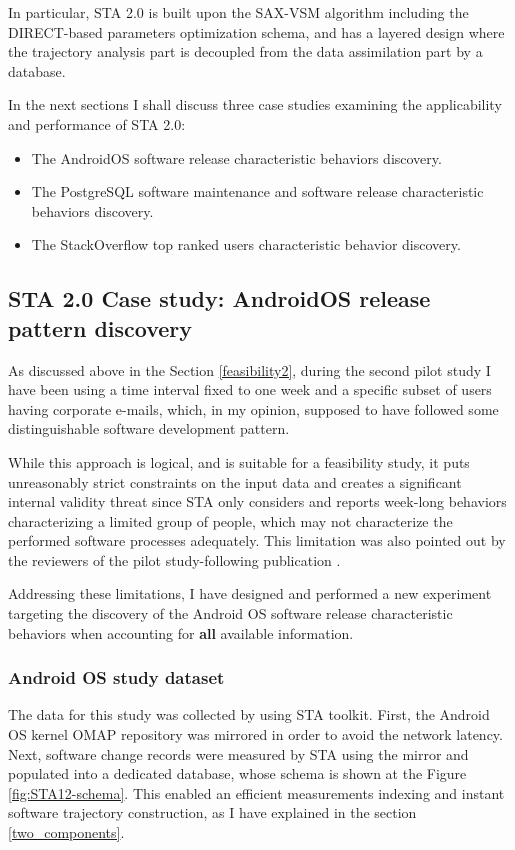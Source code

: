 In particular, STA 2.0 is built upon the SAX-VSM algorithm including the DIRECT-based parameters optimization schema, and has a layered design where the trajectory analysis part is decoupled from the data assimilation part by a database.

In the next sections I shall discuss three case studies examining the applicability and performance of STA 2.0:
\begin{itemize}
 \item The AndroidOS software release characteristic behaviors discovery.
 \item The PostgreSQL software maintenance and software release characteristic behaviors discovery.
 \item The StackOverflow top ranked users characteristic behavior discovery.
\end{itemize}

\subsection{STA 2.0 Case study: AndroidOS release pattern discovery}\label{case1}
As discussed above in the Section \ref{feasibility2}, during the second pilot study I have been using a time interval fixed to one week and a specific subset of users having corporate e-mails, which, in my opinion, supposed to have followed some distinguishable software development pattern. 

While this approach is logical, and is suitable for a feasibility study, it puts unreasonably strict constraints on the input data and creates a significant internal validity threat since STA only considers and reports week-long behaviors characterizing a limited group of people, which may not characterize the performed software processes adequately. This limitation was also pointed out by the reviewers of the pilot study-following publication \cite{csdl2-11-10}.

Addressing these limitations, I have designed and performed a new experiment targeting the discovery of the Android OS software release characteristic behaviors when accounting for \textbf{all} available information.

\subsubsection{Android OS study dataset}
The data for this study was collected by using STA toolkit. First, the Android OS kernel OMAP repository was mirrored in order to avoid the network latency. Next, software change records were measured by STA using the mirror and populated into a dedicated database, whose schema is shown at the Figure \ref{fig:STA12-schema}. This enabled an efficient measurements indexing and instant software trajectory construction, as I have explained in the section \ref{two_components}.

